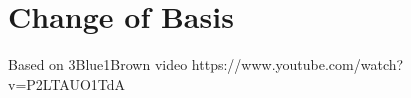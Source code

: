 \chapter{Change of Basis}
\label{sec:second-app}
Based on 3Blue1Brown video
https://www.youtube.com/watch?v=P2LTAUO1TdA

